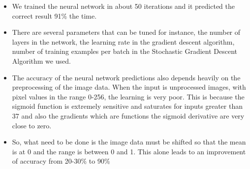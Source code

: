 \documentclass{beamer}
\begin{document}

\begin{frame}
\begin{itemize}
\item We trained the neural network in about 50 iterations and it predicted the correct result 91\% the time.
\item There are several parameters that can be tuned for instance, the number of layers in the network, the learning rate in the gradient descent algorithm, number of training examples per batch in the Stochastic Gradient Descent Algorithm we used.
\item The accuracy of the neural network predictions also depends heavily on the preprocessing of the image data. When the input is unprocessed images, with pixel values in the range 0-256, the learning is very poor. This is because the sigmoid function is extremely sensitive and saturates for inputs greater than 37 and also the gradients which are functions the sigmoid derivative are very close to zero.
\item So, what need to be done is the image data must be shifted so that the mean is at 0 and the range is between 0 and 1. This alone leads to an improvement of accuracy from 20-30\% to 90\%
\end{itemize}
\end{frame}
\end{document}
